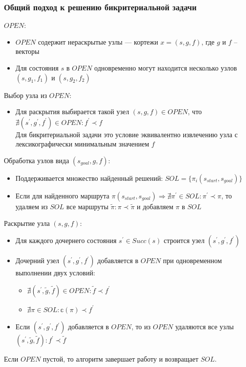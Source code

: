 \documentclass[aspectratio=169,8pt]{beamer}
\begin{document}
\begin{frame}
\frametitle{Общий подход к решению бикритериальной задачи}
$OPEN$:
\begin{itemize}
\item $OPEN$ содержит нераскрытые узлы --- кортежи $x = (s, g, f)$, где $g$ и $f$ -- векторы
\item Для состояния $s$ в $OPEN$ одновременно могут находится несколько узлов $(s, g_1, f_1)$ и $(s, g_2, f_2)$
\end{itemize}
Выбор узла из $OPEN$:
\begin{itemize}
\item Для раскрытия выбирается такой узел $(s, g, f) \in OPEN$, что $\nexists (s ^ {'}, g ^ {'}, f ^ {'}) \in OPEN: f ^ {'} \prec f$ \\
Для бикритериальной задачи это условие эквивалентно извлечению узла с лексикографически минимальным значением $f$
\end{itemize}
Обработка узлов вида $(s_{goal}, g, f)$:
\begin{itemize}
\item Поддерживается множество найденный решений: $SOL = \{\pi_i (s_{start}, s_{goal})\}$
\item Если для найденного маршрута $\pi(s_{start}, s_{goal}) \Rightarrow \nexists \pi ^ {'} \in SOL: \pi ^ {'} \prec \pi$, то удаляем из $SOL$ все маршруты $\tilde{\pi}: \pi \prec \tilde{\pi}$ и добавляем $\pi$ в $SOL$
\end{itemize}
Раскрытие узла $(s, g, f)$:
\begin{itemize}
\item Для каждого дочернего состояния $s ^ {'} \in Succ(s)$ строится узел $(s ^ {'}, g ^ {'}, f ^ {'})$
\item Дочерний узел $(s ^ {'}, g ^ {'}, f ^ {'})$ добавляется в $OPEN$ при одновременном выполнении двух условий:
\begin{itemize}
\item $\nexists (s ^ {'}, \tilde{g}, \tilde{f}) \in OPEN: \tilde{f} \prec f ^ {'}$
\item $\nexists \pi \in SOL: \mathbb{c}(\pi) \prec f ^ {'}$
\end{itemize}
\item Если $(s ^ {'}, g ^ {'}, f ^ {'})$ добавляется в $OPEN$, то из $OPEN$ удаляются все узлы $(s ^ {'}, \tilde{g}, \tilde{f}): f ^ {'} \prec \tilde{f}$
\end{itemize}
Если $OPEN$ пустой, то алгоритм завершает работу и возвращает $SOL$.

\end{frame}
\end{document}
